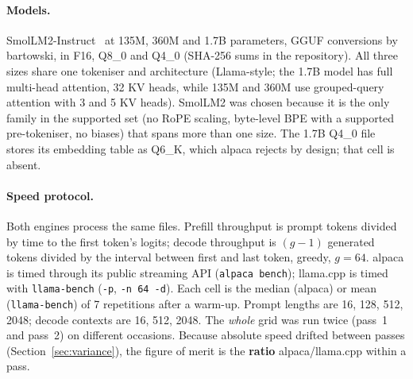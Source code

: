\documentclass[10pt,twocolumn]{article}
\begin{document}
\paragraph{Models.} SmolLM2-Instruct~\cite{smollm2} at 135M, 360M and 1.7B parameters, GGUF conversions by bartowski, in F16, Q8\_0 and Q4\_0 (SHA-256 sums in the repository). All three sizes share one tokeniser and architecture (Llama-style; the 1.7B model has full multi-head attention, 32 KV heads, while 135M and 360M use grouped-query attention with 3 and 5 KV heads). SmolLM2 was chosen because it is the only family in the supported set (no RoPE scaling, byte-level BPE with a supported pre-tokeniser, no biases) that spans more than one size. The 1.7B Q4\_0 file stores its embedding table as Q6\_K, which alpaca rejects by design; that cell is absent.

\paragraph{Speed protocol.} Both engines process the same files. Prefill throughput is prompt tokens divided by time to the first token's logits; decode throughput is $(g{-}1)$ generated tokens divided by the interval between first and last token, greedy, $g{=}64$. alpaca is timed through its public streaming API (\texttt{alpaca bench}); llama.cpp is timed with \texttt{llama-bench} (\texttt{-p}, \texttt{-n 64 -d}). Each cell is the median (alpaca) or mean (\texttt{llama-bench}) of 7 repetitions after a warm-up. Prompt lengths are 16, 128, 512, 2048; decode contexts are 16, 512, 2048. The \emph{whole} grid was run twice (pass~1 and pass~2) on different occasions. Because absolute speed drifted between passes (Section~\ref{sec:variance}), the figure of merit is the \textbf{ratio} alpaca/llama.cpp within a pass.
\end{document}
